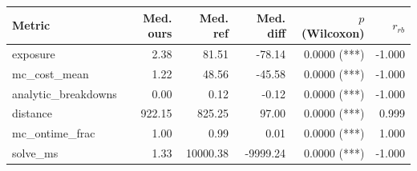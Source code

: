 \begin{tabular}{lrrrrr}
\toprule
Metric & Med. ours & Med. ref & Med. diff & $p$ (Wilcoxon) & $r_{rb}$ \\
\midrule
exposure & 2.38 & 81.51 & -78.14 & 0.0000 (***) & -1.000 \\
mc_cost_mean & 1.22 & 48.56 & -45.58 & 0.0000 (***) & -1.000 \\
analytic_breakdowns & 0.00 & 0.12 & -0.12 & 0.0000 (***) & -1.000 \\
distance & 922.15 & 825.25 & 97.00 & 0.0000 (***) & 0.999 \\
mc_ontime_frac & 1.00 & 0.99 & 0.01 & 0.0000 (***) & 1.000 \\
solve_ms & 1.33 & 10000.38 & -9999.24 & 0.0000 (***) & -1.000 \\
\bottomrule
\end{tabular}
